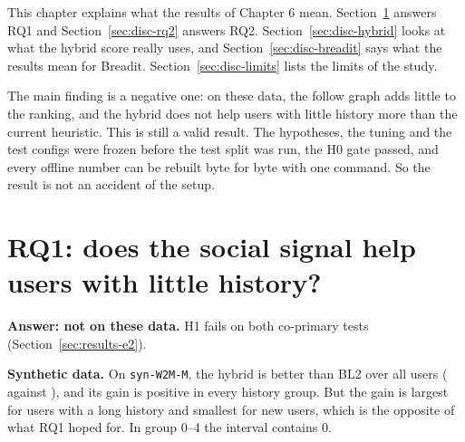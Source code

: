 
\label{ch:discussion}

This chapter explains what the results of Chapter 6 mean. Section~\ref{sec:disc-rq1} answers RQ1 and Section~\ref{sec:disc-rq2} answers RQ2. Section~\ref{sec:disc-hybrid} looks at what the hybrid score really uses, and Section~\ref{sec:disc-breadit} says what the results mean for Breadit. Section~\ref{sec:disc-limits} lists the limits of the study.

The main finding is a negative one: on these data, the follow graph adds little to the ranking, and the hybrid does not help users with little history more than the current heuristic. This is still a valid result. The hypotheses, the tuning and the test configs were frozen before the test split was run, the H0 gate passed, and every offline number can be rebuilt byte for byte with one command. So the result is not an accident of the setup.

\section{RQ1: does the social signal help users with little history?}
\label{sec:disc-rq1}

\textbf{Answer: not on these data.} H1 fails on both co-primary tests (Section~\ref{sec:results-e2}).

\textbf{Synthetic data.} On \texttt{syn-W2M-M}, the hybrid is better than BL2 over all users (\eOneWTwoMNdcgHTenAllValue{} against \eOneWTwoMNdcgBLTwoTenAllValue{}), and its gain is positive in every history group. But the gain is largest for users with a long history and smallest for new users, which is the opposite of what RQ1 hoped for. In group 0--4 the interval contains 0.

